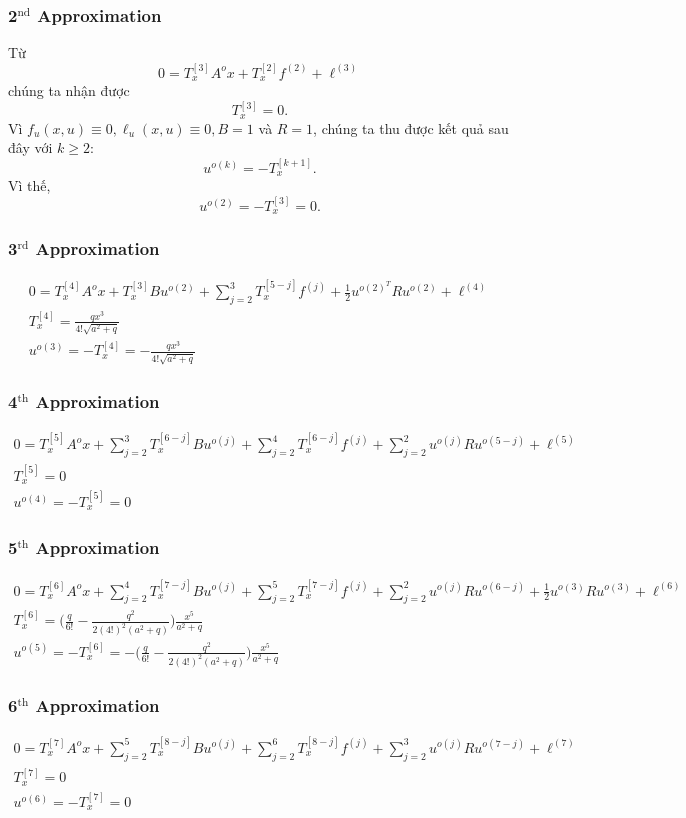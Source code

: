 \documentclass[12pt,a4paper]{report}
\begin{document}
\subsubsection{\textbf{2}$^{\text{nd}}$ Approximation} 
Từ $$0 = T_x^{[3]}A^ox + T_x^{[2]}f^{(2)} + \ell^{(3)}$$ chúng ta nhận được $$T_x^{[3]} = 0.$$ Vì $f_u(x, u) \equiv 0, \ell_u(x, u) \equiv 0, B=1$ và $R = 1$, chúng ta thu được kết quả sau đây với $k \geq 2$: $$u^{o(k)} = -T_x^{[k+1]}.$$ Vì thế, $$u^{o(2)} = -T_x^{[3]} = 0.$$
\subsubsection{\textbf{3}$^{\text{rd}}$ Approximation}
\begin{align}
	0 = T_x^{[4]}A^ox + T_x^{[3]}Bu^{o(2)} + \sum_{j=2}^{3}T_x^{[5-j]}f^{(j)} + \frac{1}{2}u^{o(2)^T}Ru^{o(2)} + \ell^{(4)} \nonumber \\ T_x^{[4]} = \frac{qx^3}{4!\sqrt{a^2 + q}} \nonumber \\ u^{o(3)} = -T_x^{[4]} = -\frac{qx^3}{4!\sqrt{a^2+q}} \nonumber
\end{align}
\subsubsection{\textbf{4}$^{\text{th}}$ Approximation}
\begin{align}
	0=T_x^{[5]}A^ox + \sum_{j=2}^{3}T_x^{[6-j]}Bu^{o(j)} + \sum_{j=2}^{4}T_x^{[6-j]}f^{(j)} + \sum_{j=2}^{2}u^{o(j)}Ru^{o(5-j)} + \ell^{(5)} \nonumber \\ T_x^{[5]} = 0 \nonumber \\ u^{o(4)} = -T_x^{[5]} = 0 \nonumber
\end{align}
\subsubsection{\textbf{5}$^{\text{th}}$ Approximation}
\begin{align}
	0 = T_x^{[6]}A^ox + \sum_{j=2}^{4}T_x^{[7-j]}Bu^{o(j)} + \sum_{j=2}^{5}T_x^{[7-j]}f^{(j)}  +\sum_{j=2}^{2}u^{o(j)}Ru^{o(6-j)} + \frac{1}{2}u^{o(3)}Ru^{o(3)}+\ell^{(6)} \nonumber \\ T_x^{[6]} = \Big(\frac{q}{6!} - \frac{q^2}{2(4!)^2(a^2+q)}\Big)\frac{x^5}{a^2+q} \nonumber \\ u^{o(5)} = -T_x^{[6]} = -\Big(\frac{q}{6!} - \frac{q^2}{2(4!)^2(a^2+q)}\Big)\frac{x^5}{a^2+q} \nonumber 
\end{align}
\subsubsection{\textbf{6}$^{\text{th}}$ Approximation}
\begin{align}
	0=T_x^{[7]}A^ox + \sum_{j=2}^{5}T_x^{[8-j]}Bu^{o(j)} + \sum_{j=2}^{6}T_x^{[8-j]}f^{(j)} + \sum_{j=2}^{3}u^{o(j)}Ru^{o(7-j)} + \ell^{(7)} \nonumber \\ T_x^{[7]} = 0 \nonumber \\u^{o(6)} = -T_x^{[7]} = 0 \nonumber
\end{align}
\end{document}
